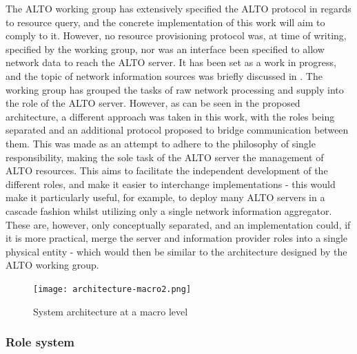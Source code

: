     The ALTO working group has extensively specified the ALTO protocol in regards to resource query, and the concrete implementation of this work will aim to comply to it.
    However, no resource provisioning protocol was, at time of writing, specified by the working group, nor was an interface been specified to allow network data to reach the ALTO server.
    It has been set as a work in progress, and the topic of network information sources was briefly discussed in \cite{alto-deployment-considerations}.
    The working group has grouped the tasks of raw network processing and supply into the role of the ALTO server.
    However, as can be seen in the proposed architecture, a different approach was taken in this work, with the roles being separated and an additional protocol proposed to bridge communication between them.
    This was made as an attempt to adhere to the philosophy of single responsibility, making the sole task of the ALTO server the management of ALTO resources.
    This aims to facilitate the independent development of the different roles, and make it easier to interchange implementations - this would make it particularly useful, for example, to deploy many ALTO servers in a cascade fashion whilst utilizing only a single network information aggregator.
    These are, however, only conceptually separated, and an implementation could, if it is more practical, merge the server and information provider roles into a single physical entity - which would then be similar to the architecture designed by the ALTO working group.

\begin{figure}[!h]
        \centering
        \texttt{[image: architecture-macro2.png]}
        \caption{System architecture at a macro level}
        \label{fig:macro-architecture}
\end{figure}

\subsubsection{Role system}
\label{sssec:system-roles}

